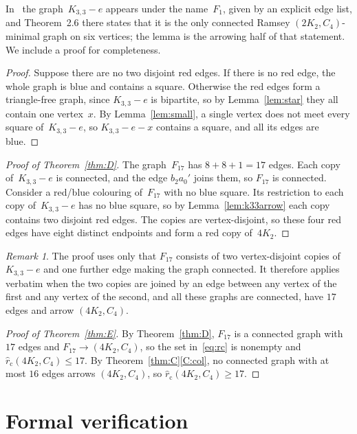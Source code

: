 \documentclass[11pt,letterpaper]{article}
\numberwithin{equation}{section}
\theoremstyle{plain}
\theoremstyle{definition}
\theoremstyle{remark}
\newtheorem{remark}[theorem]{Remark}
\newcommand{\Kme}{K_{3,3}-e}
\newcommand{\rc}{\hat r_{\mathrm{c}}}
\begin{document}
In~\cite{WYBAS15} the graph~$\Kme$ appears under the name~$F_1$, given by an explicit edge list, and Theorem~2.6 there states that it is the only connected Ramsey $(2K_2,C_4)$-minimal graph on six vertices; the lemma is the arrowing half of that statement. We include a proof for completeness.

\begin{proof}
Suppose there are no two disjoint red edges. If there is no red edge, the whole graph is blue and contains a square. Otherwise the red edges form a triangle-free graph, since $\Kme$ is bipartite, so by Lemma~\ref{lem:star} they all contain one vertex~$x$. By Lemma~\ref{lem:small}, a single vertex does not meet every square of~$\Kme$, so $\Kme-x$ contains a square, and all its edges are blue.
\end{proof}

\begin{proof}[Proof of Theorem~\ref{thm:D}]
The graph~$F_{17}$ has $8+8+1=17$ edges. Each copy of~$\Kme$ is connected, and the edge $b_2a_0'$ joins them, so $F_{17}$ is connected. Consider a red/blue colouring of~$F_{17}$ with no blue square. Its restriction to each copy of~$\Kme$ has no blue square, so by Lemma~\ref{lem:k33arrow} each copy contains two disjoint red edges. The copies are vertex-disjoint, so these four red edges have eight distinct endpoints and form a red copy of~$4K_2$.
\end{proof}

\begin{remark}\label{rem:bridge}
The proof uses only that $F_{17}$ consists of two vertex-disjoint copies of~$\Kme$ and one further edge making the graph connected. It therefore applies verbatim when the two copies are joined by an edge between any vertex of the first and any vertex of the second, and all these graphs are connected, have $17$ edges and arrow $(4K_2,C_4)$.
\end{remark}

\begin{proof}[Proof of Theorem~\ref{thm:E}]
By Theorem~\ref{thm:D}, $F_{17}$ is a connected graph with $17$ edges and $F_{17}\to(4K_2,C_4)$, so the set in~\eqref{eq:rc} is nonempty and $\rc(4K_2,C_4)\le17$. By Theorem~\ref{thm:C}\ref{C:col}, no connected graph with at most $16$ edges arrows $(4K_2,C_4)$, so $\rc(4K_2,C_4)\ge17$.
\end{proof}

\section{Formal verification}\label{sec:lean}
\end{document}
